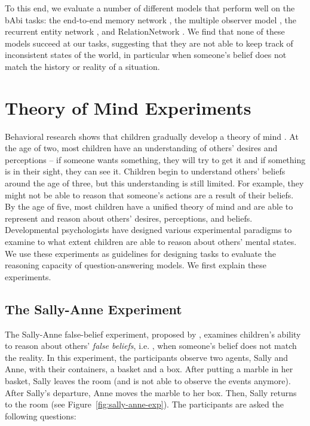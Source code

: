 To this end, we evaluate a number of different models that perform well on the bAbi tasks: the end-to-end memory network \citep{sukhbaatar2015end}, the multiple observer model \citep{grant.etal.2017}, the recurrent entity network \citep{henaff2016tracking}, and RelationNetwork \citep{santoro.etal.2017}.  We find that none of these models succeed at our tasks, suggesting that they are not able to keep track of inconsistent states of the world, in particular when someone's belief does not match the history or reality of a situation.

\section{Theory of Mind Experiments}
\label{sec:data}

Behavioral research shows that children gradually develop a theory of mind
\citep[for a review, see][]{gopnik1988children}. At the age of two, most children have an understanding of others' desires and perceptions -- if someone wants something, they will try to get it and if something  is in their sight, they can see it. Children begin to understand others' beliefs around the age of three, but this understanding is still limited. For example, they might not be able to reason that someone's actions are a result of their beliefs. By the age of five, most children have a unified theory of mind and are able to represent and reason about others' desires, perceptions, and beliefs. Developmental psychologists have designed various experimental paradigms to examine to what extent children are able to reason about others' mental states. We use these experiments as guidelines for designing tasks to evaluate the reasoning capacity of question-answering models. We first explain these experiments.

\subsection{The Sally-Anne Experiment}

The Sally-Anne false-belief experiment, proposed by \citet{baron1985does},
examines children's ability to reason about others' \textit{false beliefs}, i.e. , when someone's belief does not match the reality. In this experiment, the participants observe two agents, Sally and Anne, with their containers, a basket and a box. After putting a marble in her basket, Sally leaves the room (and is not able to observe the events anymore). After Sally's departure, Anne moves the marble to her box. Then, Sally returns to the room (see
Figure~\ref{fig:sally-anne-exp}). The participants are asked the following questions:

